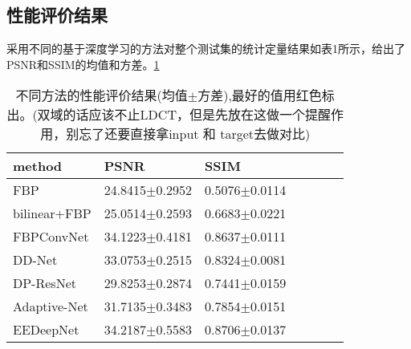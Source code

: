 \subsection{性能评价结果}
采用不同的基于深度学习的方法对整个测试集的统计定量结果如表1所示，给出了PSNR和SSIM的均值和方差。\ref{tab1}
\begin{table}[H]
	\centering
	\begin{tabular}{lllllll}  	
		\toprule   	
		method & PSNR & SSIM \\  	
		\midrule   	
		FBP & 24.8415$\pm$0.2952 & 0.5076$\pm$0.0114   \\  
		bilinear+FBP & 25.0514$\pm$0.2593 &  0.6683$\pm$0.0221   \\  
		FBPConvNet & 34.1223$\pm$0.4181 & 0.8637$\pm$0.0111   \\  	
		DD-Net & 33.0753$\pm$0.2515 & 0.8324$\pm$0.0081    \\ 
		DP-ResNet & 29.8253$\pm$0.2874 & 0.7441$\pm$0.0159  \\	  
		Adaptive-Net & 31.7135$\pm$0.3483 & 0.7854$\pm$0.0151  \\	  	
		EEDeepNet & 34.2187$\pm$0.5583 & 0.8706$\pm$0.0137  \\	
		\bottomrule  	
	\end{tabular}
	\caption{不同方法的性能评价结果(均值$\pm$方差),最好的值用红色标出。(双域的话应该不止LDCT，但是先放在这做一个提醒作用，别忘了还要直接拿input 和 target去做对比)}
	\label{tab1}
\end{table}
